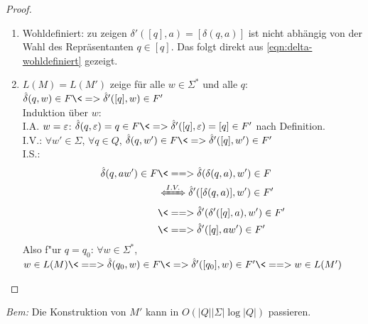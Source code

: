\begin{proof}\ 
        \begin{enumerate}
                \item Wohldefiniert: zu zeigen $\delta'([q],a) =[\delta(q,a)]$ ist nicht abhängig von der Wahl des Repräsentanten $q\in [q]$. Das folgt direkt aus \eqref{eqn:delta-wohldefiniert} gezeigt.
                \item $L(M)=L(M')$ zeige für alle $w\in\Sigma^*$ und alle $q$: $\hat\delta(q,w)\in F \<=> \hat\delta'([q],w)\in F'$\\
                Induktion über $w$:\\
                I.A. $w=\varepsilon$: $\hat\delta(q,\Eps)=q\in F \<=> \hat\delta'([q],\Eps)=[q]\in F'$ nach Definition.\\
                I.V.: $\forall w'\in\Sigma$, $\forall q\in Q$, $\hat\delta(q,w')\in F \<=> \hat\delta'([q],w')\in F'$\\
                I.S.: \begin{align*}
                \hat\delta(q,aw')\in F &\<==> \hat\delta(\delta(q,a),w')\in F\\ &\xLeftrightarrow{I.V.} \hat\delta'([\delta(q,a)],w')\in F'\\
                &\<==> \hat\delta'(\delta'([q],a),w')\in F'\\
                &\<==> \hat\delta'([q],a w')\in F'
                \end{align*}
                Also f"ur $q=q_0$: $\forall w\in\Sigma^*$, $w\in L(M)\<==> \hat\delta(q_0,w) \in F \<=> \hat\delta'([q_0],w) \in F' \<==> w\in L(M')$
        \end{enumerate}
\end{proof}
\emph{Bem:} Die Konstruktion von $M'$ kann in $O(|Q||\Sigma|\log|Q|)$ passieren.

